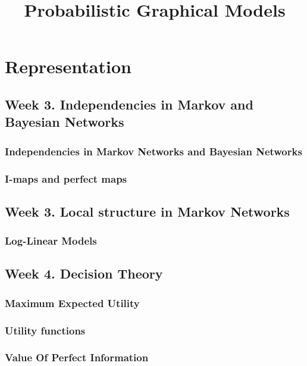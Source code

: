 \documentclass[a4paper,10pt]{article}
\title{Probabilistic Graphical Models}
\author{}
\begin{document}
\maketitle

\section{Representation}

\subsection{Week 3. Independencies in Markov and Bayesian Networks}

\subsubsection{Independencies in Markov Networks and Bayesian Networks}



\subsubsection{I-maps and perfect maps}



\subsection{Week 3. Local structure in Markov Networks}

\subsubsection{Log-Linear Models}




\subsection{Week 4. Decision Theory}

\subsubsection{Maximum Expected Utility}



\subsubsection{Utility functions}



\subsubsection{Value Of Perfect Information}


\end{document}

